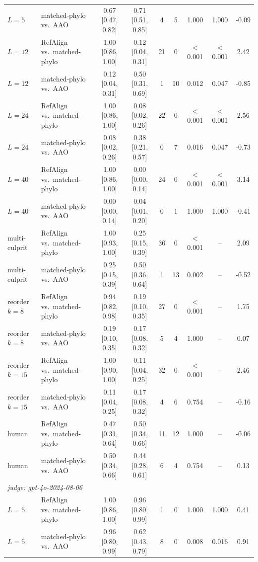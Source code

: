 \begin{table}[t]
\begin{tabular}{llccccccc}
$L{=}5$ & matched-phylo vs.\ AAO & 0.67 [0.47, 0.82] & 0.71 [0.51, 0.85] & 4 & 5 & 1.000 & 1.000 & -0.09 \\
$L{=}12$ & RefAlign vs.\ matched-phylo & 1.00 [0.86, 1.00] & 0.12 [0.04, 0.31] & 21 & 0 & $<$0.001 & $<$0.001 & 2.42 \\
$L{=}12$ & matched-phylo vs.\ AAO & 0.12 [0.04, 0.31] & 0.50 [0.31, 0.69] & 1 & 10 & 0.012 & 0.047 & -0.85 \\
$L{=}24$ & RefAlign vs.\ matched-phylo & 1.00 [0.86, 1.00] & 0.08 [0.02, 0.26] & 22 & 0 & $<$0.001 & $<$0.001 & 2.56 \\
$L{=}24$ & matched-phylo vs.\ AAO & 0.08 [0.02, 0.26] & 0.38 [0.21, 0.57] & 0 & 7 & 0.016 & 0.047 & -0.73 \\
$L{=}40$ & RefAlign vs.\ matched-phylo & 1.00 [0.86, 1.00] & 0.00 [0.00, 0.14] & 24 & 0 & $<$0.001 & $<$0.001 & 3.14 \\
$L{=}40$ & matched-phylo vs.\ AAO & 0.00 [0.00, 0.14] & 0.04 [0.01, 0.20] & 0 & 1 & 1.000 & 1.000 & -0.41 \\
multi-culprit & RefAlign vs.\ matched-phylo & 1.00 [0.93, 1.00] & 0.25 [0.15, 0.39] & 36 & 0 & $<$0.001 & -- & 2.09 \\
multi-culprit & matched-phylo vs.\ AAO & 0.25 [0.15, 0.39] & 0.50 [0.36, 0.64] & 1 & 13 & 0.002 & -- & -0.52 \\
reorder $k{=}8$ & RefAlign vs.\ matched-phylo & 0.94 [0.82, 0.98] & 0.19 [0.10, 0.35] & 27 & 0 & $<$0.001 & -- & 1.75 \\
reorder $k{=}8$ & matched-phylo vs.\ AAO & 0.19 [0.10, 0.35] & 0.17 [0.08, 0.32] & 5 & 4 & 1.000 & -- & 0.07 \\
reorder $k{=}15$ & RefAlign vs.\ matched-phylo & 1.00 [0.90, 1.00] & 0.11 [0.04, 0.25] & 32 & 0 & $<$0.001 & -- & 2.46 \\
reorder $k{=}15$ & matched-phylo vs.\ AAO & 0.11 [0.04, 0.25] & 0.17 [0.08, 0.32] & 4 & 6 & 0.754 & -- & -0.16 \\
human & RefAlign vs.\ matched-phylo & 0.47 [0.31, 0.64] & 0.50 [0.34, 0.66] & 11 & 12 & 1.000 & -- & -0.06 \\
human & matched-phylo vs.\ AAO & 0.50 [0.34, 0.66] & 0.44 [0.28, 0.61] & 6 & 4 & 0.754 & -- & 0.13 \\
\midrule
\multicolumn{9}{l}{\emph{judge: gpt-4o-2024-08-06}} \\
$L{=}5$ & RefAlign vs.\ matched-phylo & 1.00 [0.86, 1.00] & 0.96 [0.80, 0.99] & 1 & 0 & 1.000 & 1.000 & 0.41 \\
$L{=}5$ & matched-phylo vs.\ AAO & 0.96 [0.80, 0.99] & 0.62 [0.43, 0.79] & 8 & 0 & 0.008 & 0.016 & 0.91 \\

\end{tabular}
\end{table}
